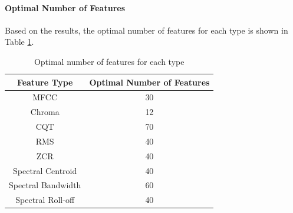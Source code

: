 \paragraph{Optimal Number of Features}

Based on the results, the optimal number of features for each type is shown in Table \ref{tab:optimal_features}.
\begin{table}[h]
    \centering
    \small
    \begin{tabular}{|c|c|}
        \hline
        \textbf{Feature Type} & \textbf{Optimal Number of Features} \\
        \hline
        MFCC                  & 30                                  \\
        Chroma                & 12                                  \\
        CQT                   & 70                                  \\
        RMS                   & 40                                  \\
        ZCR                   & 40                                  \\
        Spectral Centroid     & 40                                  \\
        Spectral Bandwidth    & 60                                  \\
        Spectral Roll-off     & 40                                  \\
        \hline
    \end{tabular}
    \caption{Optimal number of features for each type}
    \label{tab:optimal_features}
\end{table}